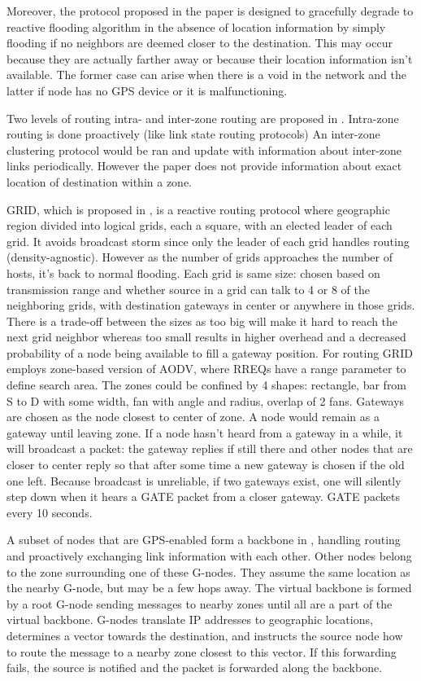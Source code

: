 \documentclass[conference]{IEEEtran}
\begin{document}
Moreover, the protocol proposed in the paper is designed to gracefully degrade to reactive flooding algorithm in the absence of location information by simply flooding if no neighbors are deemed closer to the destination.
This may occur because they are actually farther away or because their location information isn't available.
The former case can arise when there is a void in the network and the latter if node has no GPS device or it is malfunctioning.

Two levels of routing intra- and inter-zone routing are proposed in \cite{779923} .
Intra-zone routing is done proactively (like link state routing protocols)
An inter-zone clustering protocol would be ran and update with information about inter-zone links periodically.
However the paper does not  provide information about exact location of destination within a zone.

GRID, which is proposed in \cite{Liao01grid:a}, is a reactive routing protocol where geographic region divided into logical grids, each a square, with an elected leader of each grid.
It avoids broadcast storm since only the leader of each grid handles routing (density-agnostic). 
However as the number of grids approaches the number of hosts, it's back to normal flooding.
Each grid is same size: chosen based on transmission range and whether source in a grid can talk to 4 or 8 of the neighboring grids, with destination gateways in center or anywhere in those grids.
There is a trade-off between the sizes as too big will make it hard to reach the next grid neighbor whereas too small results in higher overhead and a decreased probability of a node being available to fill a gateway position.
For routing GRID employs zone-based version of AODV, where RREQs have a range parameter to define search area.
The zones could be confined by 4 shapes: rectangle, bar from S to D with some width, fan with angle and radius, overlap of 2 fans.
Gateways  are chosen as the node closest to center of zone. A node would remain as a gateway until leaving zone.
If a node hasn't heard from a gateway in a while, it will broadcast a packet: the gateway replies if still there and other nodes that are closer to center reply so that after some time a new gateway is chosen if the old one left.
Because broadcast is unreliable, if two gateways exist, one will silently step down when it hears a GATE packet from a closer gateway.
GATE packets every 10 seconds.

A subset of nodes that are GPS-enabled form a backbone in \cite{Zaruba2003}, handling routing and proactively exchanging link information with each other.
Other nodes belong to the zone surrounding one of these G-nodes.
They assume the same location as the nearby G-node, but may be a few hops away.
The virtual backbone is formed by a root G-node sending messages to nearby zones until all are a part of the virtual backbone.
G-nodes translate IP addresses to geographic locations, determines a vector towards the destination, and instructs the source node how to route the message to a nearby zone closest to this vector.
If this forwarding fails, the source is notified and the packet is forwarded along the backbone.
\end{document}
